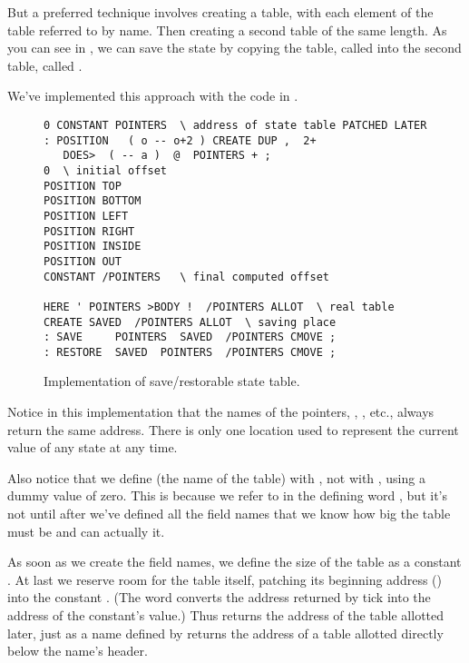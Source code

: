 But a preferred technique involves creating a table, with each
element of the table referred to by name. Then creating a second table of
the same length. As you can see in , we can save the state by
copying the table, called  into the second table, called
.



We've implemented this approach with the code in .

\begin{figure*}[tttt]
\caption{Implementation of save/restorable state table.}
\begin{center}
\begin{BVerbatim}
0 CONSTANT POINTERS  \ address of state table PATCHED LATER
: POSITION   ( o -- o+2 ) CREATE DUP ,  2+
   DOES>  ( -- a )  @  POINTERS + ;
0  \ initial offset
POSITION TOP
POSITION BOTTOM
POSITION LEFT
POSITION RIGHT
POSITION INSIDE
POSITION OUT
CONSTANT /POINTERS   \ final computed offset

HERE ' POINTERS >BODY !  /POINTERS ALLOT  \ real table
CREATE SAVED  /POINTERS ALLOT  \ saving place
: SAVE     POINTERS  SAVED  /POINTERS CMOVE ;
: RESTORE  SAVED  POINTERS  /POINTERS CMOVE ;
\end{BVerbatim}
\end{center}
\end{figure*}

Notice in this implementation that the names of the pointers,
, , etc., always return the same address.
There is only one location used to represent the current value of any
state at any time.

Also notice that we define  (the name of the table)
with , not with , using a dummy value of
zero. This is because we refer to  in the defining
word , but it's not until after we've defined all the
field names that we know how big the table must be and can actually
 it.

As soon as we create the field names, we define the size of the table
as a constant . At last we reserve room for the table
itself, patching its beginning address () into the
constant .  (The word  converts the
address returned by tick into the address of the constant's value.)
Thus  returns the address of the table allotted later,
just as a name defined by  returns the address of a
table allotted directly below the name's header.

